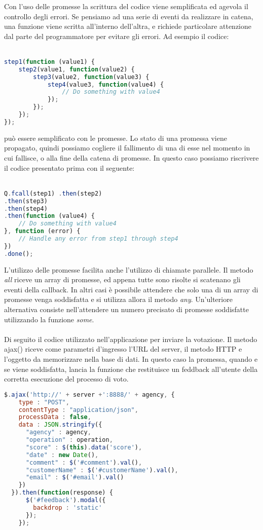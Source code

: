 Con l'uso delle promesse la scrittura del codice viene semplificata ed agevola
il controllo degli errori. Se pensiamo ad una serie di eventi da realizzare in
catena, una funzione viene scritta all'interno dell'altra, e richiede
particolare attenzione dal parte del programmatore per evitare gli errori. Ad
esempio il codice:
\\\\
\begin{lstlisting}[language=JavaScript] 
step1(function (value1) {
    step2(value1, function(value2) {
        step3(value2, function(value3) {
            step4(value3, function(value4) {
                // Do something with value4
            });
        });
    });
}); 
\end{lstlisting}
può essere semplificato con le promesse. Lo stato di una promessa viene
propagato, quindi possiamo cogliere il fallimento di una di esse nel
momento in cui fallisce, o alla fine della catena di promesse. In
questo caso possiamo riscrivere il codice presentato prima con il seguente:
\\\\
\begin{lstlisting}[language=JavaScript] Q.fcall(step1) .then(step2)
.then(step3)
.then(step4)
.then(function (value4) {
    // Do something with value4
}, function (error) {
    // Handle any error from step1 through step4
})
.done();
\end{lstlisting}
L'utilizzo delle promesse facilita anche l'utilizzo di chiamate parallele. Il
metodo \emph{all} riceve un array di promesse, ed appena tutte
sono risolte si scatenano gli eventi della callback. In altri casi è possibile
attendere che solo una di un array di promesse venga soddisfatta e si utilizza
allora il metodo \emph{any}. Un'ulteriore alternativa consiste nell'attendere un
numero precisato di promesse soddisfatte utilizzando la funzione \emph{some}.
\\\\
Di seguito il codice utilizzato nell'applicazione per inviare la votazione.
Il metodo ajax() riceve come parametri d'ingresso l'URL del server,   
il metodo \ac{HTTP} e l'oggetto da memorizzare nella base di dati. In questo
caso la promessa, quando e se viene soddisfatta, lancia la funzione che restituisce un
feddback all'utente della corretta esecuzione del processo di voto. 

 \begin{lstlisting}[language=JavaScript] 
$.ajax('http://' + server +':8888/' + agency, { 
    type : "POST",
    contentType : "application/json",
    processData : false,
    data : JSON.stringify({
      "agency" : agency,
      "operation" : operation,
      "score" : $(this).data('score'),
      "date" : new Date(),
      "comment" : $('#comment').val(),
      "customerName" : $('#customerName').val(),
      "email" : $('#email').val()
    })
  }).then(function(response) {
      $('#feedback').modal({
        backdrop : 'static'
      });
    });
\end{lstlisting}